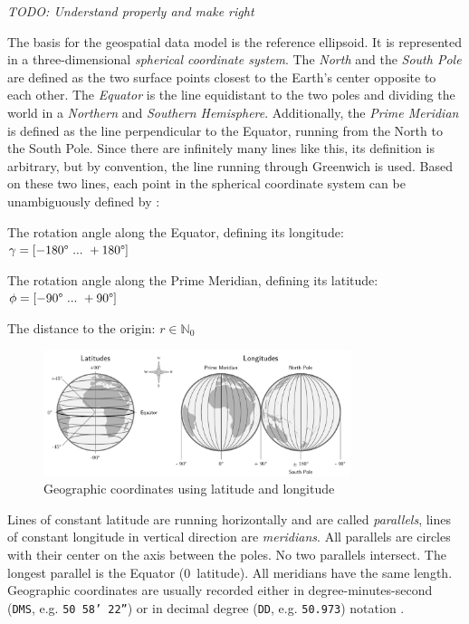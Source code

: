 \emph{TODO: Understand properly and make right}

The basis for the geospatial data model is the reference ellipsoid. It is represented in a three-dimensional \emph{spherical coordinate system}. The \emph{North} and the \emph{South Pole} are defined as the two surface points closest to the Earth's center opposite to each other. The \emph{Equator} is the line equidistant to the two poles and dividing the world in a \emph{Northern} and \emph{Southern Hemisphere}. Additionally, the \emph{Prime Meridian} is defined as the line perpendicular to the Equator, running from the North to the South Pole. Since there are infinitely many lines like this, its definition is arbitrary, but by convention, the line running through Greenwich is used. Based on these two lines, each point in the spherical coordinate system can be unambiguously defined by
\cite[pp. 26-28]{bolstad2008gis}:

\begin{compactenum}
  \item The rotation angle along the Equator, defining its longitude: $\gamma = [-180\degree ~...~ +180\degree]$
  \item The rotation angle along the Prime Meridian, defining its latitude: $\phi = [-90\degree ~...~ +90\degree]$
  \item The distance to the origin: $r \in \mathbb{N}_0$
\end{compactenum}

\begin{figure}[ht]
  \vspace{0.5em}
  \centering
  \includegraphics[width=0.8\textwidth]{graphics/basics/hgis/geo_coordinates}
  \caption{Geographic coordinates using latitude and longitude}
  \label{fig:geo-coordinates}
\end{figure}

Lines of constant latitude are running horizontally and are called \emph{parallels}, lines of constant longitude in vertical direction are \emph{meridians}. All parallels are circles with their center on the axis between the poles. No two parallels intersect. The longest parallel is the Equator (0\degree~latitude). All meridians have the same length. Geographic coordinates are usually recorded either in degree-minutes-second (\texttt{DMS}, e.g. \texttt{50\degree~58' 22''}) or in decimal degree (\texttt{DD}, e.g. \texttt{50.973}) notation
\cite[pp. 30, 79]{bolstad2008gis}.



